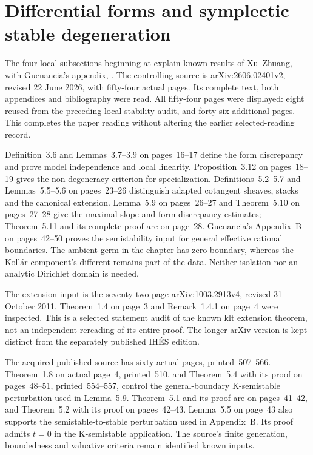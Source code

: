 \section{Differential forms and symplectic stable degeneration}
\label{sec:provenance-local-klt-stable-forms}

The four local subsections beginning at
 explain known results of Xu--Zhuang,
with Guenancia's appendix, \cite{XuZhuang26StableFormsV2}.
The controlling source is arXiv:2606.02401v2, revised 22 June
2026, with fifty-four actual pages. Its complete text, both
appendices and bibliography were read. All fifty-four pages were
displayed: eight reused from the preceding local-stability audit,
and forty-six additional pages. This completes the paper reading
without altering the earlier selected-reading record.

Definition~3.6 and Lemmas~3.7--3.9 on pages~16--17 define
the form discrepancy and prove model independence and local
linearity. Proposition~3.12 on pages~18--19 gives the
non-degeneracy criterion for specialization. Definitions~5.2--5.7
and Lemmas~5.5--5.6 on pages~23--26 distinguish adapted
cotangent sheaves, stacks and the canonical extension.
Lemma~5.9 on pages~26--27 and Theorem~5.10 on pages~27--28
give the maximal-slope and form-discrepancy estimates;
Theorem~5.11 and its complete proof are on page~28.
Guenancia's Appendix~B on pages~42--50 proves the
semistability input for general effective rational boundaries.
The ambient germ in the chapter has zero boundary, whereas
the Koll\'ar component's different remains part of the data.
Neither isolation nor an analytic Dirichlet domain is needed.

The extension input \cite{GKKP11FormsV4} is the seventy-two-page
arXiv:1003.2913v4, revised 31 October 2011. Theorem~1.4 on
page~3 and Remark~1.4.1 on page~4 were inspected. This is a
selected statement audit of the known klt extension theorem,
not an independent rereading of its entire proof. The longer
arXiv version is kept distinct from the separately published
IH\'ES edition.

The acquired published source
\cite{LiuXuZhuang22ThresholdsPublished} has sixty actual pages,
printed~507--566. Theorem~1.8 on actual page~4, printed~510,
and Theorem~5.4 with its proof on pages~48--51,
printed~554--557, control the general-boundary K-semistable
perturbation used in Lemma~5.9. Theorem~5.1 and its proof
are on pages~41--42, and Theorem~5.2 with its proof on
pages~42--43. Lemma~5.5 on page~43 also supports the
semistable-to-stable perturbation used in Appendix~B.
Its proof admits $t=0$ in the K-semistable application.
The source's finite generation, boundedness and valuative
criteria remain identified known inputs.


